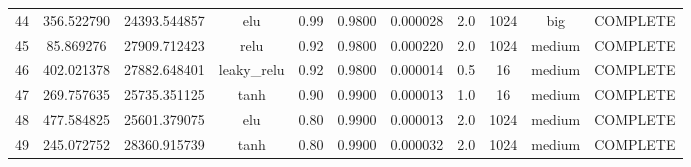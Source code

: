 \begin{longtable}{ccccccccccc}
                       44 &                 356.522790 &                       24393.544857 &             elu &        0.99 & 0.9800 &       0.000028 &             2.0 &     1024 &       big & COMPLETE \\
                       45 &                  85.869276 &                       27909.712423 &            relu &        0.92 & 0.9800 &       0.000220 &             2.0 &     1024 &    medium & COMPLETE \\
                       46 &                 402.021378 &                       27882.648401 &     leaky\_relu &        0.92 & 0.9800 &       0.000014 &             0.5 &       16 &    medium & COMPLETE \\
                       47 &                 269.757635 &                       25735.351125 &            tanh &        0.90 & 0.9900 &       0.000013 &             1.0 &       16 &    medium & COMPLETE \\
                       48 &                 477.584825 &                       25601.379075 &             elu &        0.80 & 0.9900 &       0.000013 &             2.0 &     1024 &    medium & COMPLETE \\
                       49 &                 245.072752 &                       28360.915739 &            tanh &        0.80 & 0.9900 &       0.000032 &             2.0 &     1024 &    medium & COMPLETE \\
\end{longtable}
